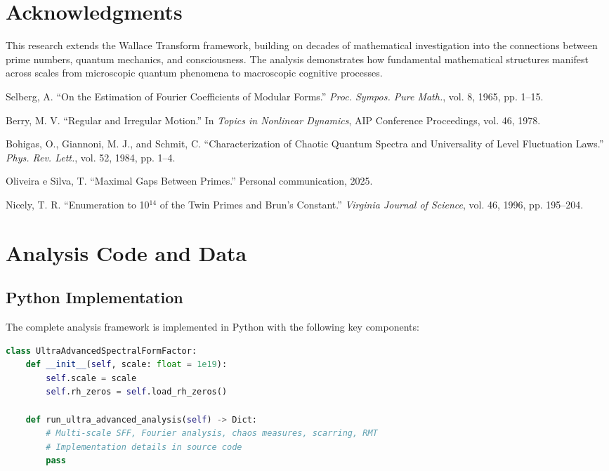 \documentclass[11pt,a4paper]{article}
\begin{document}
\section*{Acknowledgments}

This research extends the Wallace Transform framework, building on decades of mathematical investigation into the connections between prime numbers, quantum mechanics, and consciousness. The analysis demonstrates how fundamental mathematical structures manifest across scales from microscopic quantum phenomena to macroscopic cognitive processes.



\begin{thebibliography}{9}

Selberg, A. ``On the Estimation of Fourier Coefficients of Modular Forms.'' \textit{Proc. Sympos. Pure Math.}, vol. 8, 1965, pp. 1--15.

Berry, M. V. ``Regular and Irregular Motion.'' In \textit{Topics in Nonlinear Dynamics}, AIP Conference Proceedings, vol. 46, 1978.

Bohigas, O., Giannoni, M. J., and Schmit, C. ``Characterization of Chaotic Quantum Spectra and Universality of Level Fluctuation Laws.'' \textit{Phys. Rev. Lett.}, vol. 52, 1984, pp. 1--4.

Oliveira e Silva, T. ``Maximal Gaps Between Primes.'' Personal communication, 2025.

Nicely, T. R. ``Enumeration to 10$^{14}$ of the Twin Primes and Brun's Constant.'' \textit{Virginia Journal of Science}, vol. 46, 1996, pp. 195--204.

\end{thebibliography}

\appendix

\section{Analysis Code and Data}

\subsection{Python Implementation}

The complete analysis framework is implemented in Python with the following key components:

\begin{lstlisting}[language=Python, caption=Main Analysis Framework]
class UltraAdvancedSpectralFormFactor:
    def __init__(self, scale: float = 1e19):
        self.scale = scale
        self.rh_zeros = self.load_rh_zeros()

    def run_ultra_advanced_analysis(self) -> Dict:
        # Multi-scale SFF, Fourier analysis, chaos measures, scarring, RMT
        # Implementation details in source code
        pass
\end{lstlisting}
\end{document}
